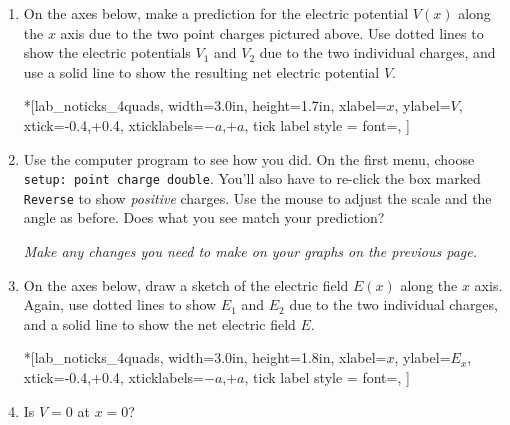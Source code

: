 \begin{enumerate}[labparts]

\item On the axes below, make a prediction for the electric potential $V(x)$ along the $x$ axis due to the two point charges pictured above.  Use dotted lines to show the electric potentials $V_1$ and $V_2$ due to the two individual charges, and use a solid line to show the resulting net electric potential $V$.  

\begin{lab_axis}*[lab_noticks_4quads,
	width={3.0in}, height={1.7in},
	xlabel=$x$,
	ylabel=$V$,
	xtick={-0.4,+0.4},
	xticklabels={$-a$,$+a$},
	tick label style = {font=\itshape},
	]
\end{lab_axis}

\item Use the computer program to see how you did.  On the first menu, choose \verb!setup: point charge double!.  You'll also have to re-click the box marked \verb!Reverse! to show \textit{positive} charges.  Use the mouse to adjust the scale and the angle as before.  Does what you see match your prediction?
\answerspace{0.3in}

\textit{Make any changes you need to make on your graphs on the previous page.}

\item On the axes below, draw a sketch of the electric field $E(x)$ along the $x$ axis.  Again, use dotted lines to show $E_1$ and $E_2$ due to the two individual charges, and a solid line to show the net electric field $E$.

\begin{lab_axis}*[lab_noticks_4quads,
	width={3.0in}, height={1.8in},
	xlabel=$x$,
	ylabel=$E_x$,
	xtick={-0.4,+0.4},
	xticklabels={$-a$,$+a$},
	tick label style = {font=\itshape},
	]
\end{lab_axis}


\item Is $V=0$ at $x=0$?
\answerspace{0.3in}


\end{enumerate}
